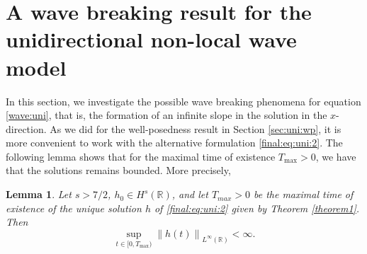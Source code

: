 \documentclass[final,11pt,a4paper,reqno]{amsart}
\newcommand{\norm}[1]{\left\| #1 \right\|}
\newcommand{\RR}{\mathbb R}
\newtheorem{lem}[satz]{Lemma}
\theoremstyle{definition}
\begin{document}
\section{A wave breaking result for the unidirectional non-local wave model}\label{sec:breaking}
In this section, we investigate the possible wave breaking phenomena for equation \eqref{wave:uni}, that is, the formation of an infinite slope in the solution in the $x$-direction. As we did for the well-posedness result in Section \ref{sec:uni:wp}, it is more convenient to work with the alternative formulation \eqref{final:eq:uni:2}. 
The following lemma shows that for the maximal time of existence $T_{\max}>0$, we have that the solutions remains bounded. More precisely, 
\begin{lem}\label{Lem:bound:Linf}
Let $s>{7/2}$, $h_{0}\in H^{s}(\mathbb{R})$, and let $T_{max}>0$ be the maximal time of existence of the unique solution $h$ 
of \eqref{final:eq:uni:2} given by Theorem \ref{theorem1}. Then 
\begin{equation}\label{bound:Linf}
\displaystyle\sup_{t\in [0,T_{\max})}\norm{h(t)}_{L^{\infty}(\RR)} <\infty.
\end{equation}
\end{lem}
\end{document}
